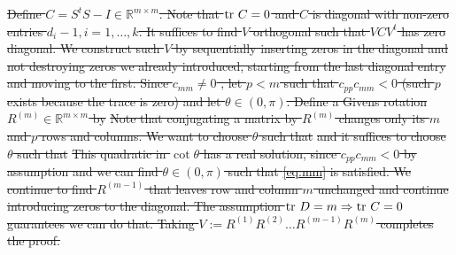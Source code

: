 \documentclass[ba]{imsart}
\newcommand{\R}{\ensuremath{\mathbb{R}}}
\newcommand{\ttr}[1]{\textup{tr}\ #1}
\theoremstyle{plain}
\theoremstyle{definition}
\theoremstyle{remark}
\providecommand{\DIFdeltex}[1]{{\protect\color{red}\sout{#1}}}                      %
\providecommand{\DIFdelbegin}{} %
\providecommand{\DIFdel}[1]{\texorpdfstring{\DIFdeltex{#1}}{}} %
\newcommand{\DIFscaledelfig}{0.5}
\newlength{\DIFdelgraphicswidth} %
\newlength{\DIFdelgraphicsheight} %
\newcommand{\DIFdelincludegraphics}[2][]{%
\sbox{\DIFdelgraphicsbox}{\DIFOincludegraphics[#1]{#2}}%
\settoboxwidth{\DIFdelgraphicswidth}{\DIFdelgraphicsbox} %
\settoboxtotalheight{\DIFdelgraphicsheight}{\DIFdelgraphicsbox} %
\scalebox{\DIFscaledelfig}{%
\parbox[b]{\DIFdelgraphicswidth}{\usebox{\DIFdelgraphicsbox}\\[-\baselineskip] \rule{\DIFdelgraphicswidth}{0em}}\llap{\resizebox{\DIFdelgraphicswidth}{\DIFdelgraphicsheight}{%
\setlength{\unitlength}{\DIFdelgraphicswidth}%
\begin{picture}(1,1)%
\thicklines\linethickness{2pt} %
{\color[rgb]{1,0,0}\put(0,0){\framebox(1,1){}}}%
{\color[rgb]{1,0,0}\put(0,0){\line( 1,1){1}}}%
{\color[rgb]{1,0,0}\put(0,1){\line(1,-1){1}}}%
\end{picture}%
}\hspace*{3pt}}} %
} %
\DeclareRobustCommand{\DIFdelbegin}{\DIFOdelbegin \let\includegraphics\DIFdelincludegraphics} %
\begin{document}
\DIFdelbegin \DIFdel{Define $C = S^tS - I \in \R^{m \times m}$. Note that $\ttr C = 0$ and
  $C$ is diagonal with non-zero entries $d_i-1,i=1,\dots,k$. It suffices
  to find $V$ orthogonal such that $V C V^t$ has zero diagonal. We
  construct such $V$ by sequentially inserting zeros in the diagonal
  and not destroying zeros we already introduced, starting from the
  last diagonal entry and moving to the first. Since $c_{mm} \neq 0$ ,
  let $p < m$ such that $c_{pp}c_{mm} < 0$ (such $p$ exists because
  the trace is zero) and let $\theta \in (0,\pi)$. Define a Givens
  rotation $R^{(m)} \in \R^{m \times m}$ by
  }%
\DIFdel{Note that conjugating a matrix by $R^{(m)}$ changes only its $m$ and
  $p$ rows and columns. We want to choose $\theta$ such that
  }%
\DIFdel{and it suffices to choose $\theta$ such that
  }%
\DIFdel{This quadratic in $\cot\theta$ has a real solution, since
  $c_{pp}c_{mm} < 0$ by assumption and we can find $\theta \in
  (0,\pi)$ such that \eqref{eq:mm} is satisfied.
We continue to find
  $R^{(m-1)}$ that leaves row and column $m$ unchanged and
  continue introducing zeros to the diagonal. The assumption $\ttr D =
  m \Rightarrow \ttr C = 0$ guarantees we can do that. Taking $V:=
  R^{(1)} R^{(2)} \dots R^{(m-1)}R^{(m)}$ completes the proof.
}%
\end{document}
